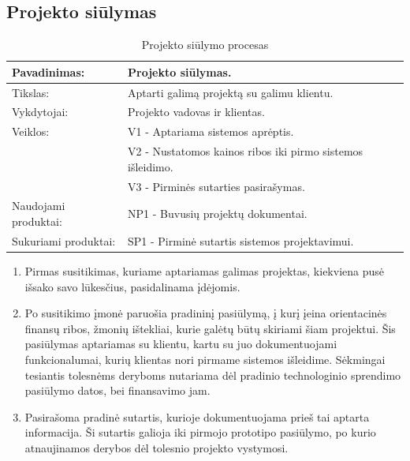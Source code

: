 \documentclass{VUMIFPSkursinis}
\begin{document}
	\subsection{Projekto siūlymas}

	\begin{center}
		\begin{table}[ht]
			\caption{Projekto siūlymo procesas}
		\begin{tabular}{ | l | l | } 
		\hline
	Pavadinimas:         & Projekto siūlymas.                                      \\ \hline
	Tikslas: 	           & Aptarti galimą projektą su galimu klientu. 							\\ \hline
	Vykdytojai:          & Projekto vadovas ir klientas.                             \\ \hline
	Veiklos:             & V1 - Aptariama sistemos aprėptis. 													\\
											 & V2 - Nustatomos kainos ribos iki pirmo sistemos išleidimo.  \\
											 & V3 - Pirminės sutarties pasirašymas.													\\ \hline
	Naudojami produktai: & NP1 - Buvusių projektų dokumentai. 													 \\ \hline
	Sukuriami produktai: & SP1 - Pirminė sutartis sistemos projektavimui. 								\\ \hline
\end{tabular}
\end{table}
\end{center}
\begin{enumerate}
	\item Pirmas susitikimas, kuriame aptariamas galimas projektas, kiekviena pusė išsako savo lūkesčius, pasidalinama įdėjomis.
	\item Po susitikimo įmonė paruošia pradininį pasiūlymą, į kurį įeina orientacinės finansų ribos, žmonių ištekliai, kurie galėtų būtų skiriami šiam projektui. Šis pasiūlymas aptariamas su klientu, kartu su juo dokumentuojami funkcionalumai, kurių klientas nori pirmame sistemos išleidime. Sėkmingai tesiantis tolesnėms deryboms nutariama dėl pradinio technologinio sprendimo pasiūlymo datos, bei finansavimo jam.
	\item Pasirašoma pradinė sutartis, kurioje dokumentuojama prieš tai aptarta informacija. Ši sutartis galioja iki pirmojo prototipo pasiūlymo, po kurio atnaujinamos derybos dėl tolesnio projekto vystymosi.
\end{enumerate}
\end{document}
